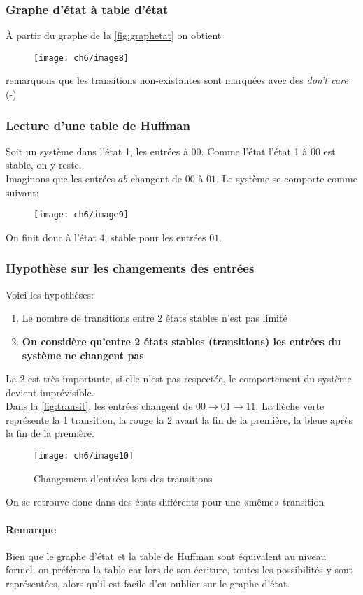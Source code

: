 \subsubsection{Graphe d'état à table d'état}
À partir du graphe de la \autoref{fig:graphetat}
on obtient
\begin{figure}[H]
	\centering
	\texttt{[image: ch6/image8]}
\end{figure}
remarquons que les transitions non-existantes sont marquées avec des \textit{don't care} (-)
\subsubsection{Lecture d'une table de Huffman}
Soit un système dans l'état 1, les entrées à $00$. Comme l'état l'état 1 à $00$ est stable, on y reste.\\
Imaginons que les entrées $ab$ changent de $00$ à $01$. Le système se comporte comme suivant:
\begin{figure}[H]
	\centering
	\texttt{[image: ch6/image9]}
\end{figure}
On finit donc à l'état 4, stable pour les entrées $01$.
\subsubsection{Hypothèse sur les changements des entrées}
Voici les hypothèses:
\begin{enumerate}
	\item Le nombre de transitions entre 2 états stables n'est pas limité
	\item \textbf{On considère qu'entre 2 états stables (transitions) les entrées du système ne changent pas}
\end{enumerate}
La 2 est très importante, si elle n'est pas respectée, le comportement du système devient imprévisible.\\
Dans la \autoref{fig:transit}, les entrées changent de $00\rightarrow 01\rightarrow 11$. La flèche verte représente la 1 transition, la rouge la 2 avant la fin de la première, la bleue après la fin de la première.
\begin{figure}[H]
	\centering
	\texttt{[image: ch6/image10]}
	\caption{Changement d'entrées lors des transitions}
	\label{fig:transit}
\end{figure}
On se retrouve donc dans des états différents pour une «même» transition
\paragraph{Remarque} Bien que le graphe d'état et la table de Huffman sont équivalent au niveau formel, on préférera la table car lors de son écriture, toutes les possibilités y sont représentées, alors qu'il est facile d'en oublier sur le graphe d'état.